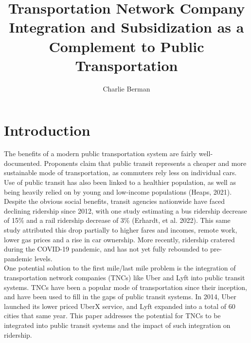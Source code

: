 \documentclass [11pt]{article}
\title{Transportation Network Company Integration and Subsidization as a Complement to Public Transportation}
\author{Charlie Berman}
\begin{document}
\maketitle

\section*{Introduction}



The benefits of a modern public transportation system are fairly well-documented. Proponents claim that public transit represents a cheaper and more sustainable mode of transportation, as commuters rely less on individual cars. Use of public transit has also been linked to a healthier population, as well as being heavily relied on by young and low-income populations (Heaps, 2021). Despite the obvious social benefits, transit agencies nationwide have faced declining ridership since 2012, with one study estimating a bus ridership decrease of 15\% and a rail ridership decrease of 3\% (Erhardt, et al. 2022). This same study attributed this drop partially to higher fares and incomes, remote work, lower gas prices and a rise in car ownership. More recently, ridership cratered during the COVID-19 pandemic, and has not yet fully rebounded to pre-pandemic levels. \\



One potential solution to the first mile/last mile problem is the integration of transportation network companies (TNCs) like Uber and Lyft into public transit systems. TNCs have been a popular mode of transportation since their inception, and have been used to fill in the gaps of public transit systems. In 2014, Uber launched its lower priced UberX service, and Lyft expanded into a total of 60 cities that same year. This paper addresses the potential for TNCs to be integrated into public transit systems and the impact of such integration on ridership.
\end{document}
